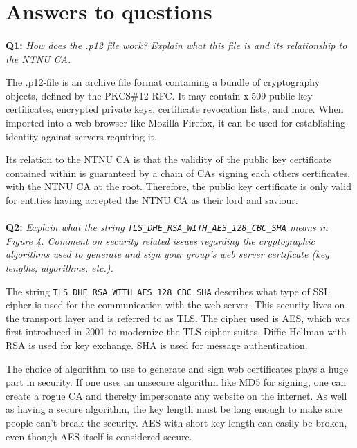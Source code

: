 \section{Answers to questions}

\paragraph{}
\textbf{Q1:}
\textit{How does the .p12 file work? Explain what this file is and its relationship to the NTNU CA.}

The .p12-file is an archive file format containing a bundle of cryptography objects, defined by the PKCS\#12 RFC\cite{pkcs-12}.
It may contain x.509 public-key certificates\cite{x509}, encrypted private keys, certificate revocation lists, and more.
When imported into a web-browser like Mozilla Firefox, it can be used for establishing identity against servers requiring it.

Its relation to the NTNU CA is that the validity of the public key certificate contained within is guaranteed by a chain of CAs signing each others certificates, with the NTNU CA at the root.
Therefore, the public key certificate is only valid for entities having accepted the NTNU CA as their lord and saviour.

\paragraph{}
\textbf{Q2:}
\cprotect\textit{Explain what the string \verb/TLS_DHE_RSA_WITH_AES_128_CBC_SHA/ means in Figure 4. Comment on security related issues regarding the cryptographic algorithms used to generate and sign your group's web server certificate (key lengths, algorithms, etc.).}

The string \verb/TLS_DHE_RSA_WITH_AES_128_CBC_SHA/ describes what type of SSL cipher is used for the communication with the web server.
This security lives on the transport layer and is referred to as TLS.
The cipher used is AES, which was first introduced in 2001\cite{rfc3268} to modernize the TLS cipher suites.
Diffie Hellman with RSA is used for key exchange.
SHA is used for message authentication.

The choice of algorithm to use to generate and sign web certificates plays a huge part in security.
If one uses an unsecure algorithm like MD5 for signing, one can create a rogue CA and thereby impersonate any website on the internet\cite{md5-harmful}.
As well as having a secure algorithm, the key length must be long enough to make sure people can't break the security.
AES with short key length can easily be broken, even though AES itself is considered secure\cite{nsa-secure}.

